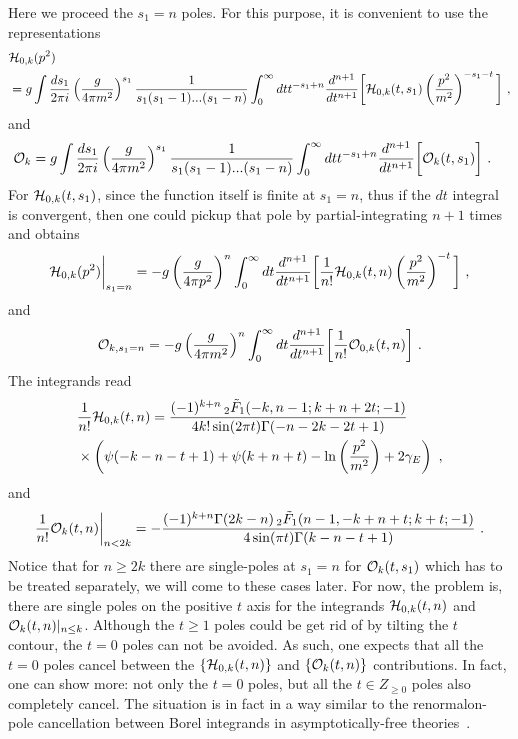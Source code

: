 \documentclass[a4paper,11pt]{article}
\begin{document}
Here we proceed the $s_1=n$ poles. For this purpose, it is convenient to use the representations
\begin{align}
&{\cal H}_{0,k}(p^2)\nonumber \\ 
&=g\int \frac{ds_1}{2\pi i} \left(\frac{g}{4\pi m^2}\right)^{s_1}\frac{1}{s_1(s_1-1)...(s_1-n)}\int_0^{\infty} dt t^{-s_1+n}\frac{d^{n+1}}{dt^{n+1}}\bigg[{\cal H}_{0,k}(t,s_1)\left(\frac{p^2}{m^2}\right)^{-s_1-t}\bigg] \ , 
\end{align}
and 
\begin{align}
&{\cal O}_{k}=g\int \frac{ds_1}{2\pi i} \left(\frac{g}{4\pi m^2}\right)^{s_1}\frac{1}{s_1(s_1-1)...(s_1-n)} \int_0^{\infty} dt t^{-s_1+n}\frac{d^{n+1}}{dt^{n+1}}\bigg[{\cal O}_{k}(t,s_1)\bigg] \ . \label{eq:operatorinter}
\end{align}
For ${\cal H}_{0,k}(t,s_1)$, since the function itself is finite at $s_1=n$, thus if the $dt$ integral is convergent, then one could pickup that pole by partial-integrating $n+1$ times and obtains
\begin{align}
{\cal H}_{0,k}(p^2)\bigg|_{s_1=n}=-g\left(\frac{g}{4\pi p^2}\right)^n\int_0^{\infty} dt \frac{d^{n+1}}{dt^{n+1}}\bigg[\frac{1}{n!}{\cal H}_{0,k}(t,n)\left(\frac{p^2}{m^2}\right)^{-t}\bigg] \ ,
\end{align}
and
\begin{align}
{\cal O}_{k,s_1=n}=-g\left(\frac{g}{4\pi m^2}\right)^n\int_0^{\infty} dt \frac{d^{n+1}}{dt^{n+1}}\bigg[\frac{1}{n!}{\cal O}_{0,k}(t,n)\bigg] \ .
\end{align}
The integrands read
\begin{align}
& \frac{1}{n!}{\cal H}_{0,k}(t,n)= \frac{  (-1)^{k+n}   \, _2\tilde{F}_1(-k,n-1;k+n+2 t;-1) }{4k! \sin(2\pi t) \Gamma (-n-2k-2t+1)} \nonumber \\ 
&\times \left(\psi(-k-n-t+1)+\psi(k+n+t)-\ln \left(\frac{p^2}{m^2}\right)+2 \gamma_E \right) \ ,
\end{align}
and
\begin{align}
\frac{1}{n!}{\cal O}_{k}(t,n)\bigg|_{n<2k}=-\frac{(-1)^{k+n} \Gamma (2 k-n) \, _2\tilde{F}_1(n-1,-k+n+t;k+t;-1)}{4 \sin (\pi  t) \Gamma (k-n-t+1)} \ .
\end{align}
Notice that for $n\ge 2k$ there are single-poles at $s_1=n$ for ${\cal O}_{k}(t,s_1)$ which has to be treated separately, we will come to these cases later. For now, the problem is, there are single poles on the positive $t$ axis for the integrands ${\cal H}_{0,k}(t,n)$ and ${\cal O}_k(t,n)|_{n\le k}$. Although the $t \ge 1$ poles could be get rid of by tilting the $t$ contour, the $t=0$ poles can not be avoided. As such, 
one expects that all the $t=0$ poles cancel between the $\{{\cal H}_{0,k}(t,n)\}$ and $\{{\cal O}_k(t,n)\}$ contributions. In fact, one can show more: not only the $t=0$ poles, but all the $t\in Z_{\ge 0}$ poles also completely cancel. The situation is in fact in a way similar to the renormalon-pole cancellation between Borel integrands in asymptotically-free theories~\cite{Beneke:1998eq,Marino:2024uco,Liu:2024omb}.
\end{document}
